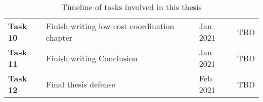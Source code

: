 \begin{table}[H]
\begin{tabular}{|l|l|l|l|}
\textbf{Task 10} & Finish writing low cost coordination chapter & Jan
2021 & TBD \\

\textbf{Task 11} & Finish writing Conclusion & Jan 2021 & TBD \\

\textbf{Task 12} & Final thesis defense & Feb 2021 & TBD \\

\hline

\end{tabular}
\vspace{0.25eX}
\captionsetup{justification=centering}
\caption{Timeline of tasks involved in this thesis}
\label{tbl:timeline}
\end{table}
